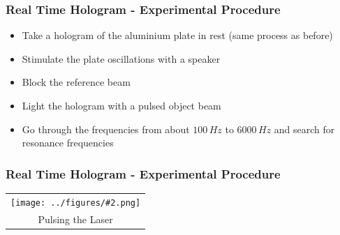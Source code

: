 \documentclass{beamer}
\newcommand{\gra}[3][]{
	\begin{table}
	\centering
	\begin{tabular}[width=\textwidth]{c}
		\texttt{[image: ../figures/\#2.png]}\\
		\small #3
	\end{tabular}
	\end{table}
}
\begin{document}
\begin{frame}
	\frametitle{Real Time Hologram - Experimental Procedure}
	\begin{itemize}
		\item Take a hologram of the aluminium plate in rest (same process as before)
		\item Stimulate the plate oscillations with a speaker
		\item Block the reference beam
		\item Light the hologram with a pulsed object beam
		\item Go through the frequencies from about $100\,\si{Hz}$ to $6000\,\si{Hz}$ and search for resonance frequencies
	\end{itemize}
\end{frame}

\begin{frame}
	\frametitle{Real Time Hologram - Experimental Procedure}
	\gra[0.85]{oszi-inv}{Pulsing the Laser}%
\end{frame}
\end{document}
